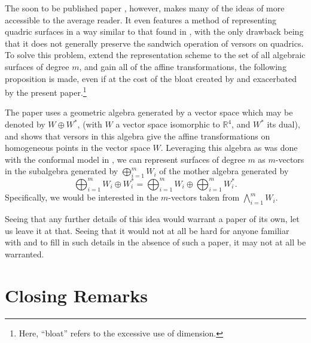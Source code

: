 \documentclass{birkjour}
\theoremstyle{definition}
\theoremstyle{remark}
\numberwithin{equation}{section}
\newcommand{\R}{\mathbb{R}}
\begin{document}
The soon to be published paper \cite{GoldmanNotYet}, however, makes many of the ideas of \cite{DoranHestenes93} more
accessible to the average reader.  It even features a method of representing quadric
surfaces in a way similar to that found in \cite{Parkin13}, with the only drawback being
that it does not generally preserve the sandwich operation of versors on quadrics.  To solve this problem,
extend the representation scheme to the set of all algebraic surfaces of degree $m$, and gain
all of the affine transformations, the following proposition is made, even if at the cost of the
bloat created by \cite{Parkin13} and exacerbated by the present paper.\footnote{Here, ``bloat'' refers
to the excessive use of dimension.}

The paper \cite{GoldmanNotYet} uses a geometric algebra generated by a vector space which may
be denoted by $W\oplus W^*$,
(with $W$ a vector space isomorphic to $\R^4$, and $W^*$ its dual), and shows that versors
in this algebra give the affine transformations on homogeneous points in the vector space $W$.
Leveraging this algebra as was done with the conformal model in \cite{Parkin13}, we can represent
surfaces of degree $m$ as $m$-vectors in the subalgebra generated by $\bigoplus_{i=1}^m W_i$ of
the mother algebra generated by
\begin{equation*}
\bigoplus_{i=1}^m W_i\oplus W_i^* = \bigoplus_{i=1}^m W_i\oplus\bigoplus_{i=1}^m W_i^*.
\end{equation*}
Specifically, we would be interested in the $m$-vectors taken from $\bigwedge_{i=1}^m W_i$.

Seeing that any further
details of this idea would warrant a paper of its own, let us leave it at that.  Seeing that it would not at all be hard for
anyone familiar with \cite{Parkin13} and \cite{GoldmanNotYet} to fill in such details in the absence of such a paper,
it may not at all be warranted.

\section{Closing Remarks}
\end{document}
